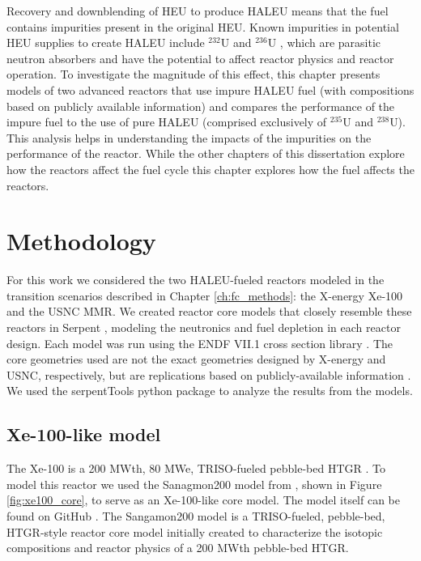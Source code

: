 Recovery and downblending of \gls{HEU} to produce \gls{HALEU} means that 
the fuel contains impurities present in the original
\gls{HEU}. Known impurities in potential \gls{HEU}
supplies to create \gls{HALEU} include $^{232}$U and $^{236}$U
\cite{vaden_isotopic_2018,nelson_foreign_2010},  
which are parasitic neutron absorbers and have the potential to affect 
reactor physics and reactor operation. To investigate the magnitude of this 
effect, this chapter presents models of two advanced reactors that use  
impure \gls{HALEU} fuel (with compositions based on publicly 
available information) and compares the performance of the impure 
fuel to the use of pure 
\gls{HALEU} (comprised exclusively of $^{235}$U and $^{238}$U). This analysis 
helps in understanding the impacts of the impurities on the performance 
of the reactor. While the other chapters of this dissertation explore 
how the reactors affect the fuel cycle this chapter explores how the 
fuel affects the reactors.  

\section{Methodology}\label{sec:neutronics-methods}
For this work we considered the two \gls{HALEU}-fueled reactors modeled 
in the transition scenarios described in Chapter \ref{ch:fc_methods}: the 
X-energy Xe-100 and the \gls{USNC} \gls{MMR}. We created reactor 
core models that closely resemble these reactors in Serpent 
\cite{leppanen_serpent_2014}, modeling the neutronics and fuel depletion  
in each reactor design. Each model was run using the ENDF VII.1 
cross section library
\cite{chadwick_endfb-vii1_2011}. The core geometries used are not 
the exact geometries designed by X-energy and \gls{USNC}, respectively, but 
are replications based on publicly-available information 
\cite{mulder_overview_2021,nuscale_chapter_2020,reyes_nuscale_2021,reyes_correction_2022}. 
We used the serpentTools python package \cite{johnson_serpenttools_2020} to 
analyze the results from the models.

\subsection{Xe-100-like model} \label{sec:xe100_serpent_model}
The Xe-100 is a 200 MWth, 80 MWe, \acrfull{TRISO}-fueled pebble-bed 
\gls{HTGR} \cite{mulder_overview_2021}. To model this reactor
we used the Sanagmon200 model from \cite{richter_isotopic_2022}, shown in 
Figure \ref{fig:xe100_core}, to serve as an Xe-100-like 
core model. The model itself can be found on GitHub \cite{richter_zoerichterphlox_2022}.
The Sangamon200 model is a \acrfull{TRISO}-fueled, pebble-bed, \gls{HTGR}-style 
reactor core model initially created to characterize the isotopic 
compositions and reactor physics of a 200 MWth pebble-bed \gls{HTGR}. 

